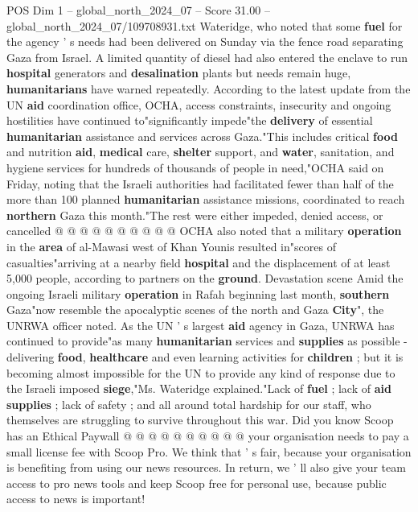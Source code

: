 \begin{textsample}{POS Dim 1 – global\_north\_2024\_07 – Score 31.00 – global\_north\_2024\_07/109708931.txt}
Wateridge, who noted that some \textbf{fuel} for the agency ' s needs had been delivered on Sunday via the fence road separating Gaza from Israel.
A limited quantity of diesel had also entered the enclave to run \textbf{hospital} generators and \textbf{desalination} plants but needs remain huge, \textbf{humanitarians} have warned repeatedly.
According to the latest update from the UN \textbf{aid} coordination office, OCHA, access constraints, insecurity and ongoing hostilities have continued to"significantly impede"the \textbf{delivery} of essential \textbf{humanitarian} assistance and services across Gaza."This includes critical \textbf{food} and nutrition \textbf{aid}, \textbf{medical} care, \textbf{shelter} support, and \textbf{water}, sanitation, and hygiene services for hundreds of thousands of people in need,"OCHA said on Friday, noting that the Israeli authorities had facilitated fewer than half of the more than 100 planned \textbf{humanitarian} assistance missions, coordinated to reach \textbf{northern} Gaza this month."The rest were either impeded, denied access, or cancelled @ @ @ @ @ @ @ @ @ @ OCHA also noted that a military \textbf{operation} in the \textbf{area} of al-Mawasi west of Khan Younis resulted in"scores of casualties"arriving at a nearby field \textbf{hospital} and the displacement of at least 5,000 people, according to partners on the \textbf{ground}.
Devastation scene Amid the ongoing Israeli military \textbf{operation} in Rafah beginning last month, \textbf{southern} Gaza"now resemble the apocalyptic scenes of the north and Gaza \textbf{City}", the UNRWA officer noted.
As the UN ' s largest \textbf{aid} agency in Gaza, UNRWA has continued to provide"as many \textbf{humanitarian} services and \textbf{supplies} as possible - delivering \textbf{food}, \textbf{healthcare} and even learning activities for \textbf{children} ; but it is becoming almost impossible for the UN to provide any kind of response due to the Israeli imposed \textbf{siege},"Ms.
Wateridge explained."Lack of \textbf{fuel} ; lack of \textbf{aid} \textbf{supplies} ; lack of safety ; and all around total hardship for our staff, who themselves are struggling to survive throughout this war.
Did you know Scoop has an Ethical Paywall @ @ @ @ @ @ @ @ @ @ your organisation needs to pay a small license fee with Scoop Pro.
We think that ' s fair, because your organisation is benefiting from using our news resources.
In return, we ' ll also give your team access to pro news tools and keep Scoop free for personal use, because public access to news is important!

\end{textsample}
